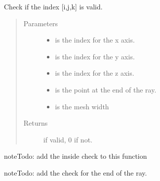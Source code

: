 \documentclass[letterpaper,10pt,english]{sphinxmanual}
\begin{document}
\begin{fulllineitems}
\label{\detokenize{index:DictionarySparseMatrix.stopcheck}}
Check if the index {[}i,j,k{]} is valid.
\begin{quote}\begin{description}
\item[{Parameters}] \leavevmode\begin{itemize}
\item {} 
 \textendash{} is the index for the x axis.

\item {} 
 \textendash{} is the index for the y axis.

\item {} 
 \textendash{} is the index for the z axis.

\item {} 
 \textendash{} is the point at the end of the ray.

\item {} 
 \textendash{} is the mesh width

\end{itemize}

\item[{Returns}]  if valid, 0 if not.

\end{description}\end{quote}

\begin{sphinxadmonition}{note}{\label{\detokenize{index:id3}}Todo:}
add the inside check to this function
\end{sphinxadmonition}

\begin{sphinxadmonition}{note}{\label{\detokenize{index:id4}}Todo:}
add the check for the end of the ray.
\end{sphinxadmonition}

\end{fulllineitems}

\end{document}
